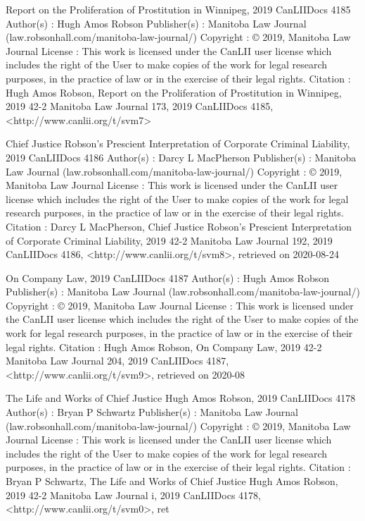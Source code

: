 Report on the Proliferation of Prostitution in Winnipeg, 2019 CanLIIDocs 4185
Author(s) : 	Hugh Amos Robson
Publisher(s) : 	Manitoba Law Journal (law.robsonhall.com/manitoba-law-journal/)
Copyright : 	© 2019, Manitoba Law Journal
License : 	This work is licensed under the CanLII user license which includes the right of the User to make copies of the work for legal research purposes, in the practice of law or in the exercise of their legal rights.
Citation : 	Hugh Amos Robson, Report on the Proliferation of Prostitution in Winnipeg, 2019 42-2 Manitoba Law Journal 173, 2019 CanLIIDocs 4185, <http://www.canlii.org/t/svm7>

Chief Justice Robson’s Prescient Interpretation of Corporate Criminal Liability, 2019 CanLIIDocs 4186
Author(s) : 	Darcy L MacPherson
Publisher(s) : 	Manitoba Law Journal (law.robsonhall.com/manitoba-law-journal/)
Copyright : 	© 2019, Manitoba Law Journal
License : 	This work is licensed under the CanLII user license which includes the right of the User to make copies of the work for legal research purposes, in the practice of law or in the exercise of their legal rights.
Citation : 	Darcy L MacPherson, Chief Justice Robson’s Prescient Interpretation of Corporate Criminal Liability, 2019 42-2 Manitoba Law Journal 192, 2019 CanLIIDocs 4186, <http://www.canlii.org/t/svm8>, retrieved on 2020-08-24


On Company Law, 2019 CanLIIDocs 4187
Author(s) : 	Hugh Amos Robson
Publisher(s) : 	Manitoba Law Journal (law.robsonhall.com/manitoba-law-journal/)
Copyright : 	© 2019, Manitoba Law Journal
License : 	This work is licensed under the CanLII user license which includes the right of the User to make copies of the work for legal research purposes, in the practice of law or in the exercise of their legal rights.
Citation : 	Hugh Amos Robson, On Company Law, 2019 42-2 Manitoba Law Journal 204, 2019 CanLIIDocs 4187, <http://www.canlii.org/t/svm9>, retrieved on 2020-08


The Life and Works of Chief Justice Hugh Amos Robson, 2019 CanLIIDocs 4178
Author(s) : 	Bryan P Schwartz
Publisher(s) : 	Manitoba Law Journal (law.robsonhall.com/manitoba-law-journal/)
Copyright : 	© 2019, Manitoba Law Journal
License : 	This work is licensed under the CanLII user license which includes the right of the User to make copies of the work for legal research purposes, in the practice of law or in the exercise of their legal rights.
Citation : 	Bryan P Schwartz, The Life and Works of Chief Justice Hugh Amos Robson, 2019 42-2 Manitoba Law Journal i, 2019 CanLIIDocs 4178, <http://www.canlii.org/t/svm0>, ret


